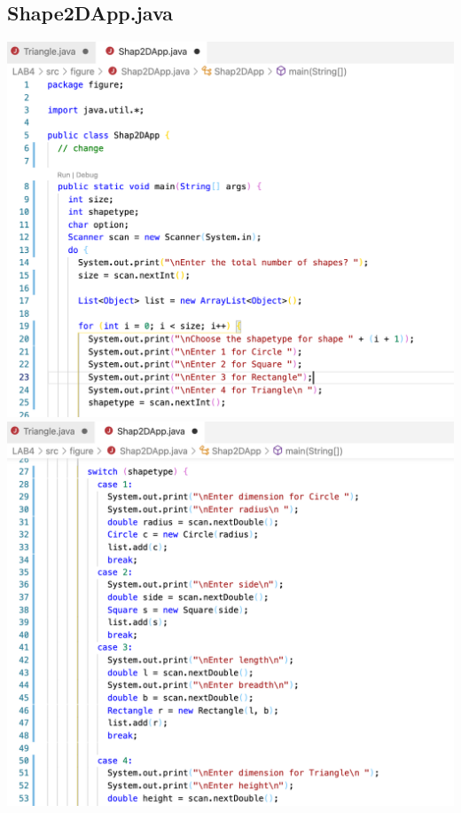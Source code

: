 \documentclass[hidelinks,12pt]{article}
\begin{document}
    \subsection{Shape2DApp.java}
     
    \includegraphics[scale=0.35]{z_shap2dapp1.png}
    \includegraphics[scale=0.35]{z_shape2dapp2.png}
    
\end{document}
